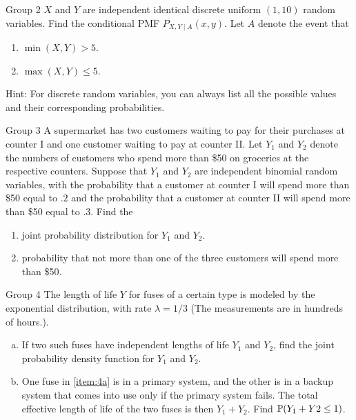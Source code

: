 \documentclass{article}
\begin{document}
\begin{problem}
    {Group 2}
    $X$ and $Y$ are independent identical discrete uniform $(1, 10)$ random variables. Find the conditional PMF $P_{X,Y \mid A}(x, y)$. Let $A$ denote the event that
    \begin{enumerate}
        \item $\min(X, Y) > 5$.
        \item $\max(X, Y) \leq 5$.
    \end{enumerate}
    \begin{solution}
        {Hint:}
        For discrete random variables, you can always list all the possible values and their corresponding probabilities.
    \end{solution}
\end{problem}

\begin{problem}
    {Group 3}
    A supermarket has two customers waiting to pay for their purchases at counter I and one customer waiting to pay at counter II. Let $Y_1$ and $Y_2$ denote the numbers of customers who spend more than \$50 on groceries at the respective counters. Suppose that $Y_1$ and $Y_2$ are independent binomial random variables, with the probability that a customer at counter I will spend more than \$50 equal to $.2$ and the probability that a customer at counter II will spend more than \$50 equal to $.3$. Find the
    \begin{enumerate}
        \item joint probability distribution for $Y_1$ and $Y_2$.
        \item probability that not more than one of the three customers will spend more than \$50.
    \end{enumerate}
\end{problem}

\begin{problem}
    {Group 4}
    The length of life $Y$ for fuses of a certain type is modeled by the exponential distribution, with rate $\lambda=1/3$ (The measurements are in hundreds of hours.).
    \begin{enumerate}[(a)]
        \item If two such fuses have independent lengths of life $Y_1$ and $Y_2$, find the joint probability density function for $Y_1$ and $Y_2$.\label{item:4a}
        \item One fuse in \cref{item:4a} is in a primary system, and the other is in a backup system that comes into use only if the primary system fails. The total effective length of life of the two fuses is then $Y_1 + Y_2$. Find $\P{Y_1 + Y2 \leq 1}$.
    \end{enumerate}
\end{problem}
\end{document}
